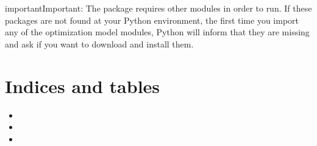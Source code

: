 \documentclass[letterpaper,10pt,english]{sphinxmanual}
\begin{document}
\begin{sphinxadmonition}{important}{Important:}
The {\hyperref[\detokenize{source/optimization.model:module-optimization.model}]{}} package requires other modules in order to run. If these packages are not found at your Python environment,
the first time you import any of the optimization model modules, Python will inform that they are missing and ask if you want to download and install them.
\begin{quote}

\begin{sphinxVerbatim}[commandchars=\\\{\}]
 
\end{sphinxVerbatim}

\begin{sphinxVerbatim}[commandchars=\\\{\}]
\PYG{l+s+s2}{Pulp package not found. To install it, type [}\PYG{l+s+s2}{]/N:  Y}
\end{sphinxVerbatim}
\end{quote}
\end{sphinxadmonition}


\chapter{Indices and tables}
\label{\detokenize{index:indices-and-tables}}\begin{itemize}
\item {} 

\item {} 

\item {} 

\end{itemize}
\end{document}
